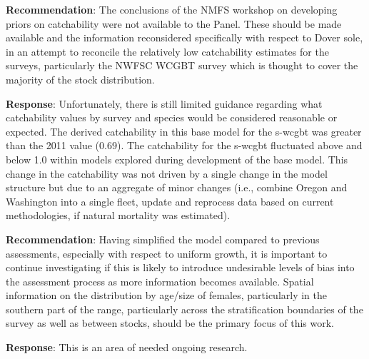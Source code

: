 \documentclass[11pt,
  english,
  a4paper,
]{article}
\begin{document}
\leavevmode\tagmcend\tagstructend\par


\textbf{Recommendation}: The conclusions of the NMFS workshop on developing priors on catchability were not available to the Panel. These should be made available and the information reconsidered specifically with respect to Dover sole, in an attempt to reconcile the relatively low catchability estimates for the surveys, particularly the NWFSC WCGBT survey which is thought to cover the majority of the stock distribution.

\leavevmode\tagmcend\tagstructend\par


\textbf{Response}: Unfortunately, there is still limited guidance regarding what catchability values by survey and species would be considered reasonable or expected. The derived catchability in this base model for the \gls{s-wcgbt} was greater than the 2011 value (0.69). The catchability for the \gls{s-wcgbt} fluctuated above and below 1.0 within models explored during development of the base model. This change in the catchability was not driven by a single change in the model structure but due to an aggregate of minor changes (i.e., combine Oregon and Washington into a single fleet, update and reprocess data based on current methodologies, if natural mortality was estimated).

\leavevmode\tagmcend\tagstructend\par


\textbf{Recommendation}: Having simplified the model compared to previous assessments, especially with respect to uniform growth, it is important to continue investigating if this is likely to introduce undesirable levels of bias into the assessment process as more information becomes available. Spatial information on the distribution by age/size of females, particularly in the southern part of the range, particularly across the stratification boundaries of the survey as well as between stocks, should be the primary focus of this work.

\leavevmode\tagmcend\tagstructend\par


\textbf{Response}: This is an area of needed ongoing research.
\end{document}
